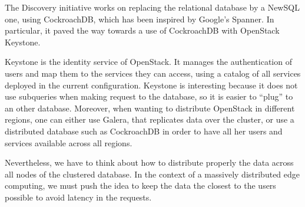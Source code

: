 The Discovery initiative works on replacing the relational database by a NewSQL one, using CockroachDB, which has been inspired by Google's Spanner\cite{CRDB:HLC}. In particular, it paved the way towards a use of CockroachDB with OpenStack Keystone.

Keystone is the identity service of OpenStack. It manages the authentication of users and map them to the services they can access, using a catalog of all services deployed in the current configuration. Keystone is interesting because it does not use subqueries when making request to the database, so it is easier to ``plug'' to an other database. Moreover, when wanting to distribute OpenStack in different regions, one can either use Galera, that replicates data over the cluster, or use a distributed database such as CockroachDB in order to have all her users and services available across all regions.

Nevertheless, we have to think about how to distribute properly the data across all nodes of the clustered database. In the context of a massively distributed edge computing, we must push the idea to keep the data the closest to the users possible to avoid latency in the requests.
